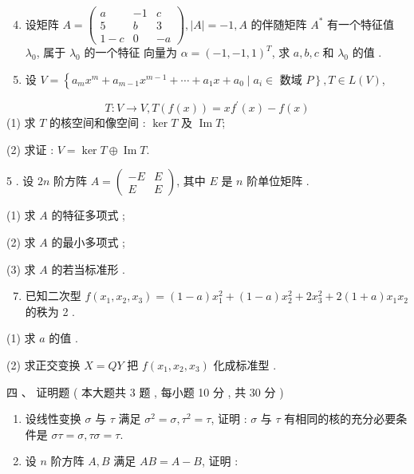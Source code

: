 \documentclass[10pt]{article}
\begin{document}
{\begin{enumerate}
  \setcounter{enumi}{3}
  \item  设矩阵  $A=\left(\begin{array}{ccc}a & -1 & c \\ 5 & b & 3 \\ 1-c & 0 & -a\end{array}\right),|A|=-1, A$  的伴随矩阵  $A^{*}$  有一个特征值  $\lambda_{0}$,  属于  $\lambda_{0}$  的一个特征   向量为  $\alpha=(-1,-1,1)^{T}$,  求  $a, b, c$  和  $\lambda_{0}$  的值 .

  \item  设  $V=\left\{a_{m} x^{m}+a_{m-1} x^{m-1}+\cdots+a_{1} x+a_{0} \mid a_{i} \in\right.$  数域  $\left.P\right\}, T \in L(V)$,

\end{enumerate}
$$
T: V \rightarrow V, T(f(x))=x f^{\prime}(x)-f(x)
$$
(1)  求  $T$  的核空间和像空间 : $\operatorname{ker} T$  及  $\operatorname{Im} T$;

(2)  求证 : $V=\operatorname{ker} T \oplus \operatorname{Im} T$.

5 .  设  $2 n$  阶方阵  $A=\left(\begin{array}{cc}-E & E \\ E & E\end{array}\right)$,  其中  $E$  是  $n$  阶单位矩阵 .

(1)  求  $A$  的特征多项式 ;

(2)  求  $A$  的最小多项式 ;

(3)  求  $A$  的若当标准形 .

\begin{enumerate}
  \setcounter{enumi}{6}
  \item  已知二次型  $f\left(x_{1}, x_{2}, x_{3}\right)=(1-a) x_{1}^{2}+(1-a) x_{2}^{2}+2 x_{3}^{2}+2(1+a) x_{1} x_{2}$  的秩为  2 .
\end{enumerate}
(1)  求  $a$  的值 .

(2)  求正交变换  $X=Q Y$  把  $f\left(x_{1}, x_{2}, x_{3}\right)$  化成标准型 .

 四 、 证明题 ( 本大题共  3  题 ,  每小题  10  分 ,  共  30  分 )

\begin{enumerate}
  \item  设线性变换  $\sigma$  与  $\tau$  满足  $\sigma^{2}=\sigma, \tau^{2}=\tau$,  证明 : $\sigma$  与  $\tau$  有相同的核的充分必要条件是  $\sigma \tau=\sigma, \tau \sigma=\tau$.

  \item  设  $n$  阶方阵  $A, B$  满足  $A B=A-B$,  证明 :


\end{enumerate}}
\end{document}

